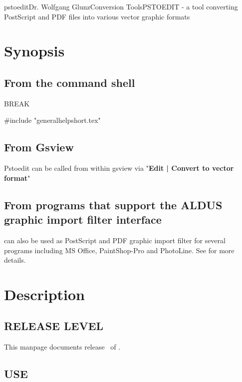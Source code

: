 \documentclass[english,a4paper]{article}
\begin{document}
\begin{Name}{1}{pstoedit}{Dr. Wolfgang Glunz}{Conversion Tools}{PSTOEDIT}
   - a tool converting PostScript and PDF files into various
  vector graphic formats
\end{Name}

\section{Synopsis}

\subsection{From the command shell}

 
BREAK

#include "generalhelpshort.tex"

\subsection{From Gsview}

Pstoedit can be called from within gsview via
"\textbf{Edit | Convert to vector format}"

\subsection{From programs that support the ALDUS graphic import filter interface}

 can also be used as PostScript and PDF graphic import filter for several programs including
MS Office, PaintShop-Pro and PhotoLine. See
 for more
details.


\section{Description}

\subsection{RELEASE LEVEL}

This manpage documents release \Version\ of .

\subsection{USE}
\end{document}
